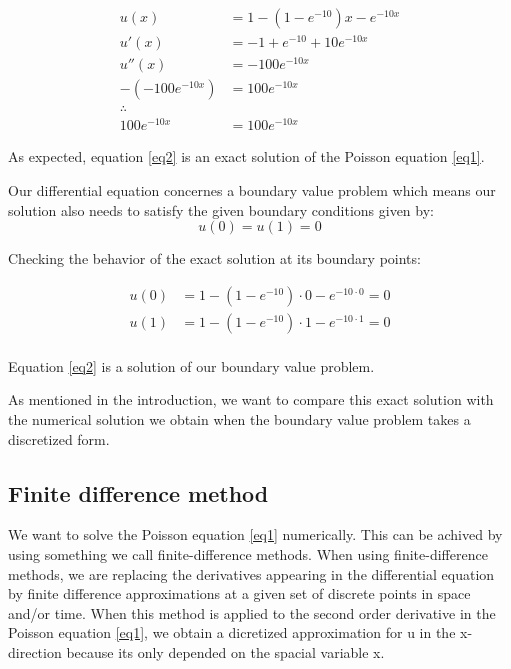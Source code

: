 \documentclass{article}
\begin{document}
\begin{align*}
u(x)& = 1 - (1-e^{-10})x - e^{-10x}  \\
u'(x)& = -1 + e^{-10} + 10e^{-10x} \\
u''(x)& = -100e^{-10x}  \\
-(-100e^{-10x})& = 100e^{-10x} \\
\therefore \\
100e^{-10x}& = 100e^{-10x}
\end{align*}

As expected, equation \eqref{eq2} is an exact solution of the Poisson equation \eqref{eq1}. 

\medskip

Our differential equation concernes a boundary value problem which means our solution also needs to satisfy the given boundary conditions given by:
\begin{equation}\label{eq4}
u(0) = u(1) = 0
\end{equation}

Checking the behavior of the exact solution at its boundary points:

\begin{align*}
u(0)& = 1-(1-e^{-10})\cdot 0 -e^{-10\cdot 0} = 0 \\
u(1)& = 1-(1-e^{-10})\cdot 1 -e^{-10\cdot 1} = 0 \\
\end{align*}

Equation \eqref{eq2} is a solution of our boundary value problem.

\medskip

As mentioned in the introduction, we want to compare this exact solution with the numerical solution we obtain when the boundary value problem takes a discretized form. 

\subsection{Finite difference method}

We want to solve the Poisson equation \eqref{eq1} numerically. This can be achived by using something we call finite-difference methods. When using finite-difference methods, we are replacing the derivatives appearing in the differential equation by finite difference approximations at a given set of discrete points in space and/or time. When this method is applied to the second order derivative in the Poisson equation \eqref{eq1}, we obtain a dicretized approximation for u in the x-direction because its only depended on the spacial variable x.  
\end{document}
